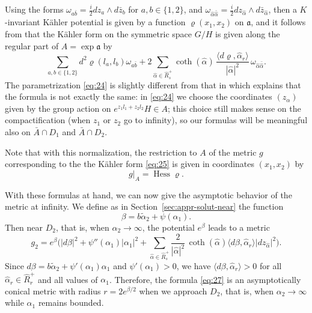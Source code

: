 \documentclass[JEP,XML,SOM,Unicode, NoEqCountersInSection, NoFloatCountersInSection]{cedram}
\theoremstyle{plain}
\theoremstyle{definition}
\DeclareMathOperator{\Hess}{Hess}
\newcommand{\fa}{\mathfrak{a}}
\newcommand{\ta}{\tilde \alpha}
\newcommand{\ha}{\hat{\alpha}}
\newcommand{\Roots}{\hat{R}}
\begin{document}
Using the forms $\omega_{a\bar b}=\frac i2 dz_a\wedge d\bar z_b$ for $a,b\in \{1,2\}$, and $\omega_{\ha\bar \ha}=\frac i2 dz_{\ha}\wedge d\bar z_{\ha}$, then a $K$-invariant Kähler potential is given by a function $\varrho(x_1,x_2)$ on $\fa$, and it follows from \cite[Cor.\,2.11]{DelHoro} that the Kähler form on the symmetric space $G/H$ is given along the regular part of $A=\exp\fa$ by
\begin{equation}
\sum_{a,b\in\{1,2\}} d^2\varrho(l_a,l_b) \omega_{a\bar b}
+ 2 \sum_{\ha\in \Roots_s^+} \coth(\ha)\, \frac{\langle d\varrho, \ha_r\rangle}{|\ha|^2}\, \omega_{\ha\bar\ha}.\label{eq:25}
\end{equation}
The parametrization \eqref{eq:24} is slightly different from that in \cite{DelHoro} which explains that the formula is not exactly the same: in \eqref{eq:24} we choose the coordinates $(z_\alpha)$ given by the group action on $e^{z_1l_1+z_2l_2}H\in A$; this choice still makes sense on the compactification (when $z_1$ or $z_2$ go to infinity), so our formulas will be meaningful also on $\bar{A}\cap D_1$ and $\bar{A}\cap D_2$.

Note that with this normalization, the restriction to $A$ of the metric $g$ corresponding to the the Kähler form \eqref{eq:25} is given in coordinates $(x_1,x_2)$ by
\begin{equation}
g|_A = \Hess \varrho.
\end{equation}

With these formulas at hand, we can now give the asymptotic behavior of the metric at infinity. We define as in
Section~\ref{sec:appr-solut-near} the function
\[ \beta = b\ta_2+\psi(\alpha_1). \]
Then near $D_2$, that is, when $\alpha_2\to\infty$, the potential $e^\beta$ leads to a metric
\begin{equation}
\label{eq:27}
g_2 = e^\beta \biggl( |d\beta|^2 + \psi''(\alpha_1) |\alpha_1|^2 + \sum_{\ha\in \Roots_s^+} \frac2{|\ha|^2}\, \coth(\ha) \langle d\beta,\ha_r\rangle |dz_{\ha}|^2 \biggr).
\end{equation}
Since $d\beta=b\ta_2+\psi'(\alpha_1)\alpha_1$ and $\psi'(\alpha_1)>0$, we have $\langle d\beta,\ha_r\rangle>0$ for all $\ha_r\in \Roots_r^+$ and all values of $\alpha_1$. Therefore, the formula \eqref{eq:27} is an asymptotically conical metric with radius $r=2e^{\beta/2}$ when we approach $D_2$, that is, when $\alpha_2\to\infty$ while $\alpha_1$ remains bounded.
\end{document}
